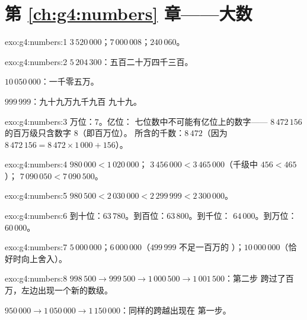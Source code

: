 \section*{第 \ref{ch:g4:numbers} 章——大数}

\begin{solution}{exo:g4:numbers:1}
$3\,520\,000$；\quad $7\,000\,008$；\quad $240\,060$。
\end{solution}

\begin{solution}{exo:g4:numbers:2}
$5\,204\,300$：五百二十万四千三百。

$10\,050\,000$：一千零五万。

$999\,999$：九十九万九千九百
九十九。
\end{solution}

\begin{solution}{exo:g4:numbers:3}
万位：$7$。亿位：
七位数中不可能有亿位上的数字——
$8\,472\,156$ 的百万级只含数字 $8$（即百万位）。
所含的千数：$8\,472$（因为
$8\,472\,156 = 8\,472 \times 1\,000 + 156$）。
\end{solution}

\begin{solution}{exo:g4:numbers:4}
$980\,000 < 1\,020\,000$；\quad
$3\,456\,000 < 3\,465\,000$（千级中 $456 < 465$）；\quad
$7\,090\,050 < 7\,090\,500$。
\end{solution}

\begin{solution}{exo:g4:numbers:5}
$980\,500 < 2\,030\,000 < 2\,299\,999 < 2\,300\,000$。
\end{solution}

\begin{solution}{exo:g4:numbers:6}
到十位：$63\,780$。到百位：$63\,800$。到千位：
$64\,000$。到万位：$60\,000$。
\end{solution}

\begin{solution}{exo:g4:numbers:7}
$5\,000\,000$；\quad $6\,000\,000$（$499\,999$ 不足一百万的
）；\quad $10\,000\,000$（恰好时向上舍入）。
\end{solution}

\begin{solution}{exo:g4:numbers:8}
$998\,500 \to 999\,500 \to 1\,000\,500 \to 1\,001\,500$：第二步
跨过了百万，左边出现一个新的数级。

$950\,000 \to 1\,050\,000 \to 1\,150\,000$：同样的跨越出现在
第一步。
\end{solution}

